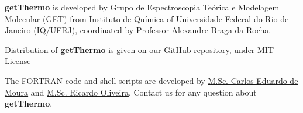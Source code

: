\documentclass[11pt,oneside,a4paper]{article}
\begin{document}
\textbf{getThermo} is developed by Grupo de Espectroscopia Teórica e Modelagem Molecular (GET) from Instituto de Química of Universidade Federal do Rio de Janeiro (IQ/UFRJ), coordinated by  \href{mailto:rocha@iq.ufrj.br}{Professor Alexandre Braga da Rocha}.

Distribution of \textbf{getThermo} is given on our \href{https://github.com/carlosevmoura/getThermo}{GitHub repository}, under \href{https://opensource.org/licenses/MIT}{MIT License}

The FORTRAN code and shell-scripts are developed by \href{mailto:carlosevmoura@iq.ufrj.br}{M.Sc. Carlos Eduardo de Moura} and \href{mailto:rrjunior@iq.ufrj.br}{M.Sc. Ricardo Oliveira}. Contact us for any question about \textbf{getThermo}.

\pagebreak


\end{document}
